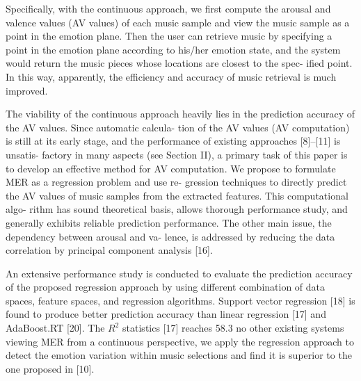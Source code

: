 \documentclass[journal, twoside]{IEEEtran}
\begin{document}
Specifically, with the continuous approach, we first compute
the arousal and valence values (AV values) of each music sample
and view the music sample as a point in the emotion plane. Then
the user can retrieve music by specifying a point in the emotion
plane according to his/her emotion state, and the system would
return the music pieces whose locations are closest to the spec-
ified point. In this way, apparently, the efficiency and accuracy
of music retrieval is much improved.

The viability of the continuous approach heavily lies in the
prediction accuracy of the AV values. Since automatic calcula-
tion of the AV values (AV computation) is still at its early stage,
and the performance of existing approaches [8]–[11] is unsatis-
factory in many aspects (see Section II), a primary task of this
paper is to develop an effective method for AV computation. We
propose to formulate MER as a regression problem and use re-
gression techniques to directly predict the AV values of music
samples from the extracted features. This computational algo-
rithm has sound theoretical basis, allows thorough performance
study, and generally exhibits reliable prediction performance.
The other main issue, the dependency between arousal and va-
lence, is addressed by reducing the data correlation by principal
component analysis [16].

An extensive performance study is conducted to evaluate the
prediction accuracy of the proposed regression approach by
using different combination of data spaces, feature spaces, and
regression algorithms. Support vector regression [18] is found
to produce better prediction accuracy than linear regression
[17] and AdaBoost.RT [20]. The $R^2$
statistics [17] reaches
58.3%
no other existing systems viewing MER from a continuous
perspective, we apply the regression approach to detect the
emotion variation within music selections and find it is superior
to the one proposed in [10].
\end{document}

